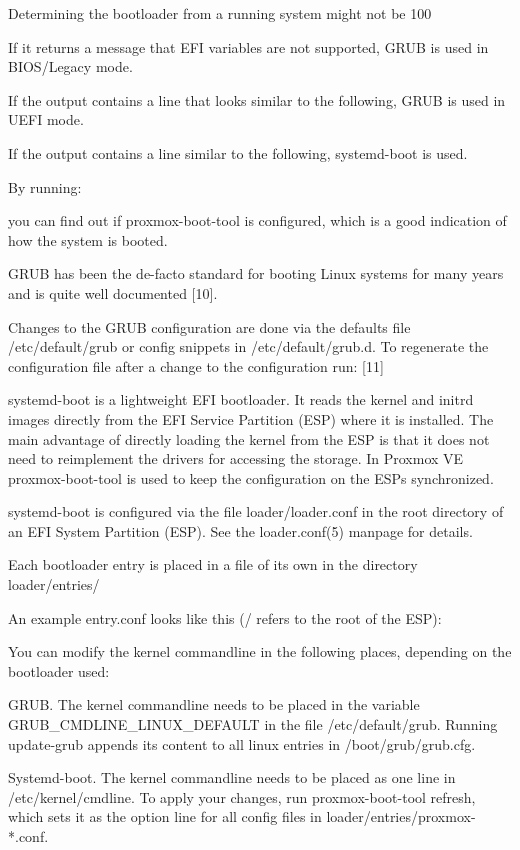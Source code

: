 Determining the bootloader from a running system might not be 100%

If it returns a message that EFI variables are not supported, GRUB is used in BIOS/Legacy mode.

If the output contains a line that looks similar to the following, GRUB is used in UEFI mode.

If the output contains a line similar to the following, systemd-boot is used.

By running:

you can find out if proxmox-boot-tool is configured, which is a good indication of how the system is booted.

GRUB has been the de-facto standard for booting Linux systems for many years and is quite well documented [10].

Changes to the GRUB configuration are done via the defaults file /etc/default/grub or config snippets in /etc/default/grub.d. To regenerate the configuration file after a change to the configuration run: [11]

systemd-boot is a lightweight EFI bootloader. It reads the kernel and initrd images directly from the EFI Service Partition (ESP) where it is installed. The main advantage of directly loading the kernel from the ESP is that it does not need to reimplement the drivers for accessing the storage. In Proxmox VE proxmox-boot-tool is used to keep the configuration on the ESPs synchronized.

systemd-boot is configured via the file loader/loader.conf in the root directory of an EFI System Partition (ESP). See the loader.conf(5) manpage for details.

Each bootloader entry is placed in a file of its own in the directory loader/entries/

An example entry.conf looks like this (/ refers to the root of the ESP):

You can modify the kernel commandline in the following places, depending on the bootloader used:

GRUB. The kernel commandline needs to be placed in the variable GRUB_CMDLINE_LINUX_DEFAULT in the file /etc/default/grub. Running update-grub appends its content to all linux entries in /boot/grub/grub.cfg.

Systemd-boot. The kernel commandline needs to be placed as one line in /etc/kernel/cmdline. To apply your changes, run proxmox-boot-tool refresh, which sets it as the option line for all config files in loader/entries/proxmox-*.conf.

